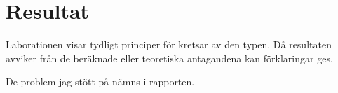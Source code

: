 %
%

\section{Resultat}\label{resultat}
Laborationen visar tydligt principer för kretsar av den typen. Då resultaten
avviker från de beräknade eller teoretiska antagandena kan förklaringar ges.
\par De problem jag stött på nämns i rapporten.

